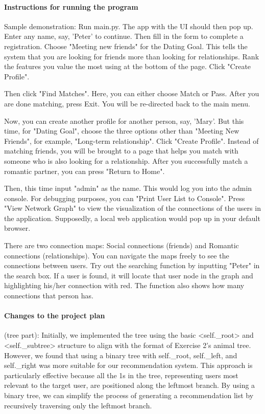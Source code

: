 \documentclass[fontsize=11pt]{article}
\begin{document}
\paragraph{Instructions for running the program}
Sample demonstration: Run main.py. The app with the UI should then pop up. Enter any name, say, 'Peter' to continue. Then fill in the form to complete a registration. Choose "Meeting new friends" for the Dating Goal. This tells the system that you are looking for friends more than looking for relationships. Rank the features you value the most using at the bottom of the page. Click "Create Profile".

Then click "Find Matches". Here, you can either choose Match or Pass. After you are done matching, press Exit. You will be re-directed back to the main menu.

Now, you can create another profile for another person, say, 'Mary'. But this time, for "Dating Goal", choose the three options other than "Meeting New Friends", for example, "Long-term relationship". Click "Create Profile". Instead of matching friends, you will be brought to a page that helps you match with someone who is also looking for a relationship. After you successfully match a romantic partner, you can press "Return to Home".

Then, this time input "admin" as the name. This would log you into the admin console. For debugging purposes, you can "Print User List to Console". Press "View Network Graph" to view the visualization of the connections of the users in the application. Supposedly, a local web application would pop up in your default browser.

There are two connection maps: Social connections (friends) and Romantic connections (relationships). You can navigate the maps freely to see the connections between users. Try out the searching function by inputting "Peter" in the search box. If a user is found, it will locate that user node in the graph and highlighting his/her connection with red. The function also shows how many connections that person has.



\paragraph{Changes to the project plan}
(tree part): Initially, we implemented the tree using the basic <self._root> and <self._subtree> structure to align with the format of Exercise 2's animal tree. However, we found that using a binary tree with self._root, self._left, and self._right was more suitable for our recommendation system. This approach is particularly effective because all the 1s in the tree, representing users most relevant to the target user, are positioned along the leftmost branch. By using a binary tree, we can simplify the process of generating a recommendation list by recursively traversing only the leftmost branch.
\end{document}
